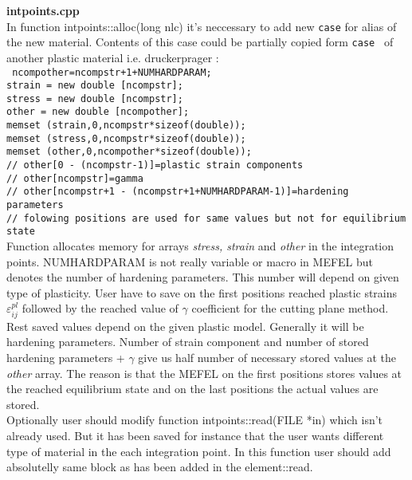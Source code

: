 {\bf intpoints.cpp}\\
In function {\sf intpoints::alloc(long nlc)} it's neccessary to add new {\tt case} for alias of
the new material. Contents of this case could be partially copied form {\tt case } of another plastic
material i.e. druckerprager :\\
{\tt
    ncompother=ncompstr+1+NUMHARDPARAM;\\
    strain = new double [ncompstr];\\
    stress = new double [ncompstr];\\
    other  = new double [ncompother];\\
    memset (strain,0,ncompstr*sizeof(double));\\
    memset (stress,0,ncompstr*sizeof(double));\\
    memset (other,0,ncompother*sizeof(double));\\
    //  other[0 - (ncompstr-1)]=plastic strain components\\
    //  other[ncompstr]=gamma\\
    //  other[ncompstr+1 - (ncompstr+1+NUMHARDPARAM-1)]=hardening parameters\\
    //  folowing positions are used for same values but not for equilibrium state
}\\
Function allocates memory for arrays {\it stress, strain} and {\it other} in the integration points.
NUMHARDPARAM is not really variable or macro in MEFEL but denotes the number of hardening parameters.
This number will depend on given type of plasticity. User have to save on the first positions reached
plastic strains $\varepsilon^{pl}_{ij}$ followed by the reached value of $\gamma$ coefficient for the cutting
plane method. Rest saved values depend on the given plastic model. Generally it will be hardening parameters.
Number of strain component and number of stored hardening parameters + $\gamma$ give us half number of necessary
stored values at the {\it other} array. The reason is that the MEFEL on the first positions stores values at
the reached equilibrium state and on the last positions the actual values are stored.\\

Optionally user should modify function {\sf intpoints::read(FILE *in)} which isn't already used.
But it has been saved for instance that the user wants different type of material in the each
integration point. In this function user should add absolutelly same block as has been added in the
{\sf element::read}.\\


